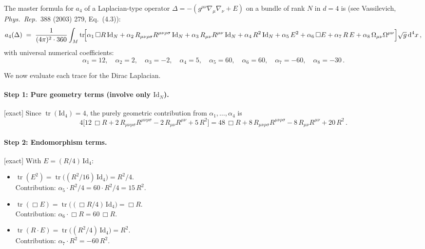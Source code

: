 \documentclass[12pt,a4paper]{article}
\theoremstyle{definition}
\theoremstyle{remark}
\newcommand{\tr}{\operatorname{tr}}
\newcommand{\Rsq}{R_{\mu\nu\rho\sigma}R^{\mu\nu\rho\sigma}}
\newcommand{\Ricsq}{R_{\mu\nu}R^{\mu\nu}}
\newcommand{\dd}{\mathrm{d}}
\newcommand{\exact}{\textcolor{blue!70!black}{\textsf{[exact]}}}
\begin{document}
The master formula for $a_4$ of a Laplacian-type operator
$\Delta = -(g^{\mu\nu}\nabla_\mu\nabla_\nu + E)$ on a bundle of
rank $N$ in $d=4$ is (see Vassilevich, \emph{Phys.\ Rep.}\ 388 (2003) 279,
Eq.~(4.3)):
\begin{equation}
  a_4(\Delta)
  \;=\;
  \frac{1}{(4\pi)^2\cdot 360}
  \int_M \tr\!\Bigl[
    \alpha_1\, \Box R\,\mathrm{Id}_N
    + \alpha_2\, \Rsq\,\mathrm{Id}_N
    + \alpha_3\, \Ricsq\,\mathrm{Id}_N
    + \alpha_4\, R^2\,\mathrm{Id}_N
    + \alpha_5\, E^2
    + \alpha_6\, \Box E
    + \alpha_7\, R\,E
    + \alpha_8\, \Omega_{\mu\nu}\Omega^{\mu\nu}
  \Bigr]\sqrt{g}\,\dd^4 x\,,
  \label{eq:a4-master}
\end{equation}
with universal numerical coefficients:
\begin{equation}
  \alpha_1 = 12,\quad
  \alpha_2 = 2,\quad
  \alpha_3 = -2,\quad
  \alpha_4 = 5,\quad
  \alpha_5 = 60,\quad
  \alpha_6 = 60,\quad
  \alpha_7 = -60,\quad
  \alpha_8 = -30\,.
  \label{eq:alphas}
\end{equation}

We now evaluate each trace for the Dirac Laplacian.

\paragraph{Step 1: Pure geometry terms (involve only $\mathrm{Id}_N$).}
\exact\;
Since $\tr(\mathrm{Id}_4) = 4$, the purely geometric contribution from
$\alpha_1,\ldots,\alpha_4$ is
\begin{equation}
  4\bigl[12\,\Box R + 2\,\Rsq - 2\,\Ricsq + 5\,R^2\bigr]
  = 48\,\Box R + 8\,\Rsq - 8\,\Ricsq + 20\,R^2\,.
  \label{eq:a4-geom}
\end{equation}

\paragraph{Step 2: Endomorphism terms.}
\exact\;
With $E = (R/4)\,\mathrm{Id}_4$:

\begin{itemize}[leftmargin=2em]
\item $\tr(E^2) = \tr\bigl((R^2/16)\,\mathrm{Id}_4\bigr) = R^2/4$.\\
  Contribution: $\alpha_5\cdot R^2/4 = 60\cdot R^2/4 = 15\,R^2$.

\item $\tr(\Box E) = \tr\bigl((\Box R/4)\,\mathrm{Id}_4\bigr) = \Box R$.\\
  Contribution: $\alpha_6\cdot\Box R = 60\,\Box R$.

\item $\tr(R\cdot E) = \tr\bigl((R^2/4)\,\mathrm{Id}_4\bigr) = R^2$.\\
  Contribution: $\alpha_7\cdot R^2 = -60\,R^2$.
\end{itemize}
\end{document}
